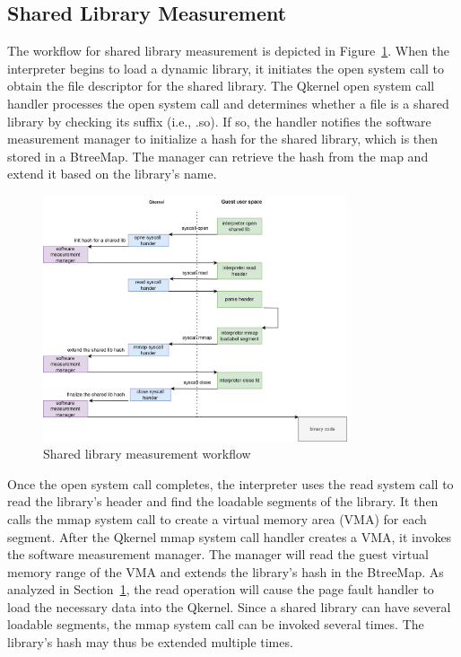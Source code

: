 \subsection{Shared Library Measurement}

The workflow for shared library measurement is depicted in Figure~\ref{fig:measure_load_shared_libarart}. When the interpreter begins to load a dynamic library, it initiates the open system call to obtain the file descriptor for the shared library. The Qkernel open system call handler processes 
the open system call and determines whether a file is a shared library by checking its suffix (i.e., .so). If so, the handler notifies the software measurement manager to initialize a hash for the shared library, which is then stored in a BtreeMap. The manager can retrieve the hash from the map 
and extend it based on the library's name.


\begin{figure}[!htb]
    \centering
    \includegraphics[width=0.8\textwidth]{images/measure_load_shared_libarart.png}
    \caption[Shared library measurement workflow]{Shared library measurement workflow}
    \label{fig:measure_load_shared_libarart}
\end{figure}

Once the open system call completes, the interpreter uses the read system call to read the library's header and find the loadable segments of the library. It then calls the mmap system call to create a virtual memory area (VMA) for each segment. After the Qkernel mmap system call handler creates a VMA, 
it invokes the software measurement manager. The manager will read the guest virtual memory range of the VMA and extends the library's hash in the BtreeMap. As analyzed in Section~\ref{fig:measure_load_shared_libarart}, the read operation will cause the page fault handler to load the necessary data 
into the Qkernel. Since a shared library can have several loadable segments, the mmap system call can be invoked several times. The library's hash may thus be extended multiple times.


